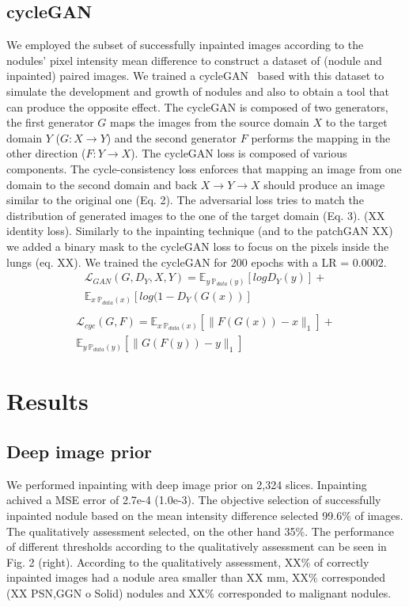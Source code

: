 \documentclass[runningheads]{llncs}
\begin{document}
\subsection{cycleGAN}
We employed the subset of successfully inpainted images according to the nodules' pixel intensity mean difference to construct a dataset of (nodule and inpainted) paired images. We trained a cycleGAN~\cite{CycleGAN2017} based with this dataset to simulate the development and growth of nodules and also to obtain a tool that can produce the opposite effect. The cycleGAN is composed of two generators, the first generator \(G\) maps the images from the source domain \(X\) to the target domain \(Y\) (\(G: X \rightarrow Y\)) and the second generator \(F\) performs the mapping in the other direction (\(F: Y \rightarrow X\)). The cycleGAN loss is composed of  various components. The cycle-consistency loss enforces that mapping an image from one domain to the second domain and back \(X \rightarrow Y \rightarrow X\) should produce an image similar to the original one (Eq. 2). The adversarial loss tries to match the distribution of generated images to the one of the target domain (Eq. 3). (XX identity loss). Similarly to the inpainting technique (and to the patchGAN XX) we added a binary mask to the cycleGAN loss to focus on the pixels inside the lungs (eq. XX). We trained the cycleGAN for 200 epochs with a LR = 0.0002. 
\begin{equation}
\begin{aligned}
\mathcal{L}_{GAN}(G, D_Y, X, Y) = \mathbb{E}_{y~\mathbb{P}_{data}(y)} [log D_Y(y)] + \\
\mathbb{E}_{x~\mathbb{P}_{data}(x)} [log(1 - D_Y(G(x))]\\
\end{aligned}
\end{equation}
\begin{equation}
\begin{aligned}
\mathcal{L}_{cyc}(G, F) = \mathbb{E}_{x~\mathbb{P}_{data}(x)} [\|F(G(x)) - x\|_1] + \\
\mathbb{E}_{y~\mathbb{P}_{data}(y)} [\|G(F(y)) - y\|_1]
\end{aligned}
\end{equation}

\section{Results}
\subsection{Deep image prior}
We performed inpainting with deep image prior on 2,324 slices. Inpainting achived a MSE error of 2.7e-4 (1.0e-3). The objective selection of successfully inpainted nodule based on the mean intensity difference selected 99.6\% of images. The qualitatively assessment selected, on the other hand 35\%.  The performance of different thresholds according to the qualitatively assessment can be seen in Fig. 2 (right). According to the qualitatively assessment, XX\% of correctly inpainted images had a nodule area smaller than XX mm, XX\% corresponded (XX PSN,GGN o Solid) nodules and XX\% corresponded to malignant nodules.
\end{document}
